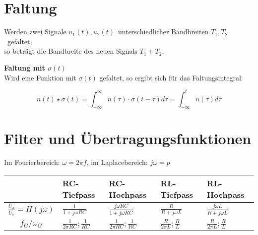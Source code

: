 \documentclass[12pt, a4paper, twoside]{scrartcl}
\begin{document}
\section{Faltung}

\begin{framed}
  Werden zwei Signale \(u_1(t), u_2(t)\)~unterschiedlicher Bandbreiten \(T_1, T_2\)~gefaltet,\\
  so beträgt die Bandbreite des neuen Signals \(T_1 + T_2\).
\end{framed}

\textbf{Faltung mit \(\sigma (t)\)}\\

Wird eine Funktion mit \(\sigma (t)\) gefaltet, so ergibt sich für das Faltungsintegral:

\[n(t) \star \sigma (t) = \int_{-\infty}^{\infty} n(\tau) \cdot \sigma(t - \tau) d\tau = \int_{-\infty}^t n(\tau) d\tau\]

\section{Filter und Übertragungsfunktionen}

Im Fourierbereich: \(\omega = 2 \pi f\), im Laplacebereich: \(j\omega = p\)

{\centering
  \begin{tabular}{cllll}
    \toprule
    & \textbf{RC-Tiefpass} & \textbf{RC-Hochpass} & \textbf{RL-Tiefpass} & \textbf{RL-Hochpass}\\
    \midrule
    \textbf{\(\displaystyle\frac{U_a}{U_e} = H(j\omega)\)} & \(\displaystyle\frac{1}{1 + j\omega R C}\) & \(\displaystyle\frac{j\omega RC}{1 + j\omega RC}\) & \(\displaystyle\frac{R}{R + j \omega L}\)& \(\displaystyle\frac{j\omega L}{R + j \omega L}\) \\[1em]
    \textbf{\(\displaystyle f_G / \omega_G\)} & \(\displaystyle\frac{1}{2 \pi R C}; \frac{1}{RC}\) & \(\displaystyle\frac{1}{2 \pi R C}; \frac{1}{RC}\) & \(\displaystyle\frac{R}{2 \pi L}; \frac{R}{L}\) & \(\displaystyle\frac{R}{2 \pi L}; \frac{R}{L}\)\\
    \bottomrule
  \end{tabular}\par
}
\end{document}
